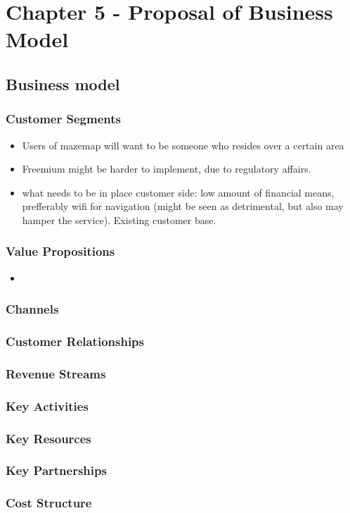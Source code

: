 \chapter{Chapter 5 - Proposal of Business Model}
\section{Business model}
\subsection{Customer Segments}

\begin{itemize}
    \item Users of mazemap will want to be someone who resides over a certain area
    \item Freemium might be harder to implement, due to regulatory affairs.
    \item what needs to be in place customer side: low amount of financial means, prefferably wifi for navigation (might be seen as detrimental, but also may hamper the service). Existing customer base. 
\end{itemize}

\subsection{Value Propositions}

\begin{itemize}
    \item  
\end{itemize}

\subsection{Channels}
\subsection{Customer Relationships}
\subsection{Revenue Streams}
\subsection{Key Activities}
\subsection{Key Resources}
\subsection{Key Partnerships}
\subsection{Cost Structure}